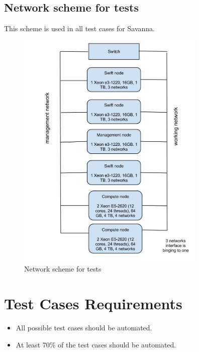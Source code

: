 \documentclass[a4paper,11pt]{article}
\begin{document}
\subsection{Network scheme for tests}
This scheme is used in all test cases for Savanna.

\begin{figure}[hb]
\caption{Network scheme for tests}
 \begin{center}
  \includegraphics[width=9cm]{HadoopLabSchema.jpg}
 \end{center}
\label{fig:MainScheme}
\end{figure}





\section{Test Cases Requirements}

\begin{itemize}
\item All possible test cases should be automated.
\item At least 70\% of the test cases should be automated.
\end{itemize}
\end{document}
